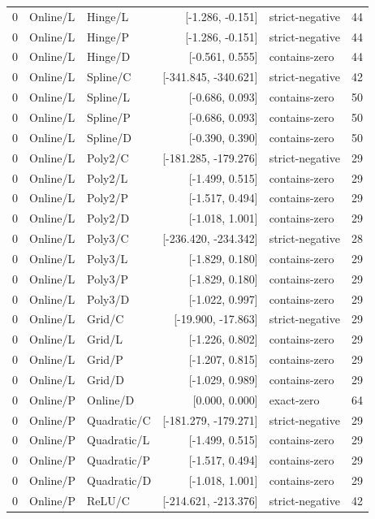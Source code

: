 \begin{longtable}{lllrlr}
0 & Online/L & Hinge/L & [-1.286, -0.151] & strict-negative & 44 \\
0 & Online/L & Hinge/P & [-1.286, -0.151] & strict-negative & 44 \\
0 & Online/L & Hinge/D & [-0.561, 0.555] & contains-zero & 44 \\
0 & Online/L & Spline/C & [-341.845, -340.621] & strict-negative & 42 \\
0 & Online/L & Spline/L & [-0.686, 0.093] & contains-zero & 50 \\
0 & Online/L & Spline/P & [-0.686, 0.093] & contains-zero & 50 \\
0 & Online/L & Spline/D & [-0.390, 0.390] & contains-zero & 50 \\
0 & Online/L & Poly2/C & [-181.285, -179.276] & strict-negative & 29 \\
0 & Online/L & Poly2/L & [-1.499, 0.515] & contains-zero & 29 \\
0 & Online/L & Poly2/P & [-1.517, 0.494] & contains-zero & 29 \\
0 & Online/L & Poly2/D & [-1.018, 1.001] & contains-zero & 29 \\
0 & Online/L & Poly3/C & [-236.420, -234.342] & strict-negative & 28 \\
0 & Online/L & Poly3/L & [-1.829, 0.180] & contains-zero & 29 \\
0 & Online/L & Poly3/P & [-1.829, 0.180] & contains-zero & 29 \\
0 & Online/L & Poly3/D & [-1.022, 0.997] & contains-zero & 29 \\
0 & Online/L & Grid/C & [-19.900, -17.863] & strict-negative & 29 \\
0 & Online/L & Grid/L & [-1.226, 0.802] & contains-zero & 29 \\
0 & Online/L & Grid/P & [-1.207, 0.815] & contains-zero & 29 \\
0 & Online/L & Grid/D & [-1.029, 0.989] & contains-zero & 29 \\
0 & Online/P & Online/D & [0.000, 0.000] & exact-zero & 64 \\
0 & Online/P & Quadratic/C & [-181.279, -179.271] & strict-negative & 29 \\
0 & Online/P & Quadratic/L & [-1.499, 0.515] & contains-zero & 29 \\
0 & Online/P & Quadratic/P & [-1.517, 0.494] & contains-zero & 29 \\
0 & Online/P & Quadratic/D & [-1.018, 1.001] & contains-zero & 29 \\
0 & Online/P & ReLU/C & [-214.621, -213.376] & strict-negative & 42 \\

\end{longtable}
